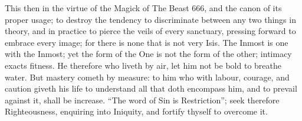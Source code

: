 This then in the virtue of the Magick of The Beast 666, and the canon of its proper usage; to destroy the tendency to discriminate between any two things in theory, and in practice to pierce the veils of every sanctuary, pressing forward to embrace every image; for there is none that is not very Isis. The Inmost is one with the Inmost; yet the form of the One is not the form of the other; intimacy exacts fitness. He therefore who liveth by air, let him not be bold to breathe water. But mastery cometh by measure: to him who with labour, courage, and caution giveth his life to understand all that doth encompass him, and to prevail against it, shall be increase. \enquote{The word of Sin is Restriction}; seek therefore Righteousness, enquiring into Iniquity, and fortify thyself to overcome it.


